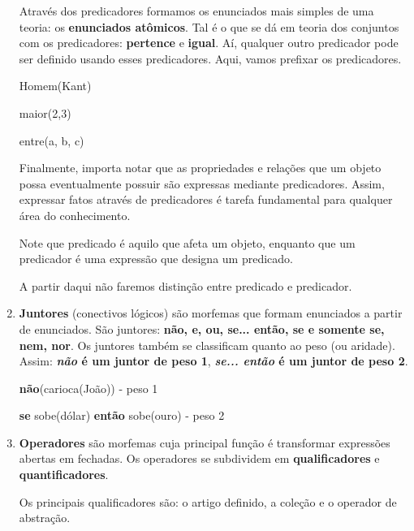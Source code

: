 \begin{enumerate}[label=\arabic*)]
    Através dos predicadores formamos os enunciados mais simples de uma teoria: os \textbf{enunciados atômicos}.
    Tal é o que se dá em teoria dos conjuntos com os predicadores: \textbf{pertence} e \textbf{igual}.
    Aí, qualquer outro predicador pode ser definido usando esses predicadores.
    Aqui, vamos prefixar os predicadores.

    \setcounter{exemplo}{0}
    \begin{exemplo}
        Homem(Kant)
    \end{exemplo}
    \begin{exemplo}
        maior(2,3)
    \end{exemplo}
    \begin{exemplo}
        entre(a, b, c)
    \end{exemplo}

    Finalmente, importa notar que as propriedades e relações que um objeto possa eventualmente possuir são expressas mediante predicadores.
    Assim, expressar fatos através de predicadores é tarefa fundamental para qualquer área do conhecimento.

    Note que predicado é aquilo que afeta um objeto, enquanto que um predicador é uma expressão que designa um predicado.

    A partir daqui não faremos distinção entre predicado e predicador.

    \item \textbf{Juntores} (conectivos lógicos) são morfemas que formam enunciados a partir de enunciados.
    São juntores: \textbf{não, e, ou, se... então, se e somente se, nem, nor}.
    Os juntores também se classificam quanto ao peso (ou aridade).
    Assim: \textbf{\textit{não} é um juntor de peso 1}, \textbf{\textit{se... então} é um juntor de peso 2}.

    \setcounter{exemplo}{0}
        \begin{exemplo}
            \textbf{não}(carioca(João)) - peso 1
        \end{exemplo}

        \begin{exemplo}
            \textbf{se} sobe(dólar) \textbf{então} sobe(ouro) - peso 2
        \end{exemplo}
    \item \textbf{Operadores} são morfemas cuja principal função é transformar expressões abertas em fechadas.
    Os operadores se subdividem em \textbf{qualificadores} e \textbf{quantificadores}.

    Os principais qualificadores são: o artigo definido, a coleção e o operador de abstração.


\end{enumerate}
